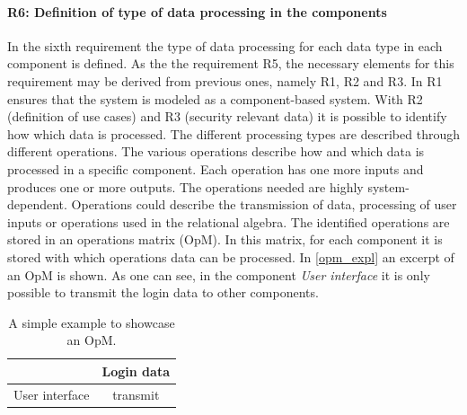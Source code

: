 \paragraph{R6: Definition of type of data processing in the components}
In the sixth requirement the type of data processing for each data type in each component is defined. As the the requirement R5, the necessary elements for this requirement may be derived from previous ones, namely R1, R2 and R3. In R1 ensures that the system is modeled as a component-based system. With R2 (definition of use cases) and R3 (security relevant data) it is possible to identify how which data is processed. The different processing types are described through different operations. The various operations describe how and which data is processed in a specific component. Each operation has one more inputs and produces one or more outputs. The  operations needed are highly system-dependent. Operations could describe the transmission of data, processing of user inputs or operations used in the relational algebra. The identified operations are stored in an operations matrix (OpM). In this matrix, for each component it is stored with which operations data can be processed.
In \autoref{opm_expl} an excerpt of an OpM is shown. As one can see, in the component \textit{User interface} it is only possible to transmit the login data to other components.

\begin{table}
\begin{tabular}{|c|c|}
\hline 
 & Login data \\ 
\hline 
User interface & transmit \\ 
\hline 
\end{tabular} 
\caption{A simple example to showcase an OpM.}
\label{opm_expl}
\end{table}

